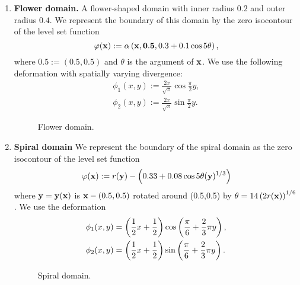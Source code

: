 \begin{enumerate}
\item \textbf{Flower domain.} A flower-shaped domain with inner radius $0.2$ and outer radius $0.4$. We represent the boundary of this domain by the zero isocontour of the level set function
\begin{equation*}
\varphi(\mathbf{x}) := \alpha \left( \mathbf{x}, \mathbf{0.5}, 0.3 + 0.1 \cos 5\theta \right),
\end{equation*}
where $\mathbf{0.5} := (0.5,0.5)$ and $\theta$ is the argument of $\mathbf{x}$. We use the following deformation with spatially varying divergence:
\begin{align*}
\phi_1(x,y) := \frac{2x}{\sqrt{\pi}} \cos \frac{\pi}{2} y, \\
\phi_2(x,y) := \frac{2x}{\sqrt{\pi}} \sin \frac{\pi}{2} y.
\end{align*}

\setlength{\figureheight}{0.40\columnwidth}
\begin{figure}[htbp]
\begin{center}
\caption{Flower domain.}
\end{center}
\end{figure}

\item \textbf{Spiral domain} We represent the boundary of the spiral domain as the zero isocontour of the level set function
\begin{equation*}
\varphi(\mathbf{x}) := r(\mathbf{y}) - \left( 0.33 + 0.08 \cos 5\theta(\mathbf{y})^{1/3} \right)
\end{equation*}
where $\mathbf{y} = \mathbf{y}(\mathbf{x})$ is $\mathbf{x} - (0.5,0.5)$ rotated around (0.5,0.5) by $\theta = 14 \left( 2r(\mathbf{x}) \right)^{1/6}$. We use the deformation
\begin{align*}
\phi_1(x,y) & = \left( \frac{1}{2} x + \frac{1}{2} \right) \cos \left( \frac{\pi}{6} + \frac{2}{3} \pi y \right), \\
\phi_2(x,y) & = \left( \frac{1}{2} x + \frac{1}{2} \right) \sin \left( \frac{\pi}{6} + \frac{2}{3} \pi y \right).
\end{align*}

\setlength{\figureheight}{0.40\columnwidth}
\begin{figure}[htbp]
\begin{center}
\caption{Spiral domain.}
\end{center}
\end{figure}

\end{enumerate}

